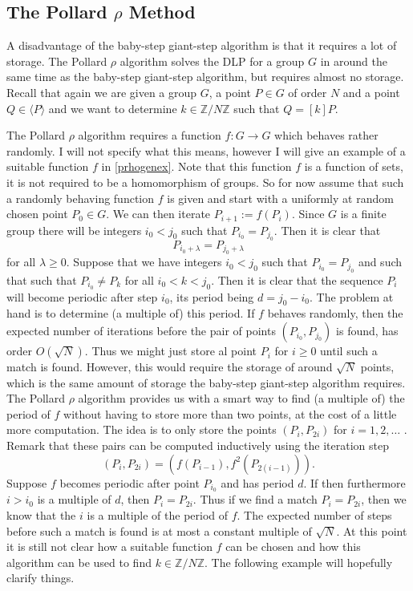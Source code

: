 \documentclass{article}
\numberwithin{equation}{section}
\theoremstyle{definition}
\newcommand{\ZZ}{{\mathbb Z}} %
\newcommand{\Zmod}[1]{\ZZ / #1\ZZ} %
\newcommand{\grgen}[1]{\langle #1 \rangle} %
\begin{document}
\subsection{The Pollard $\rho$ Method}\label{prhomethod}
A disadvantage of the baby-step giant-step algorithm is that it requires a lot of storage. The Pollard $\rho$ algorithm solves the DLP for a group $G$ in around the same time as the baby-step giant-step algorithm, but requires almost no storage. Recall that again we are given a group $G$, a point $P\in G$ of order $N$ and a point $Q\in \grgen{P}$ and we want to determine $k \in \Zmod{N}$ such that $Q=[k]P$. \par 
The Pollard $\rho$ algorithm requires a function $f:G\rightarrow G$ which behaves rather randomly. I will not specify what this means, however I will give an example of a suitable function $f$ in \ref{prhogenex}. Note that this function $f$ is a function of sets, it is not required to be a homomorphism of groups. So for now assume that such a randomly behaving function $f$ is given and start with a uniformly at random chosen point $P_0\in G$. We can then iterate $P_{i+1}:=f(P_i)$. Since $G$ is a finite group there will be integers $i_0<j_0$ such that $P_{i_0}=P_{j_0}$. Then it is clear that $$P_{i_0+\lambda} = P_{j_0+\lambda}$$  for all $\lambda \geq 0$. Suppose that we have integers $i_0<j_0$ such that $P_{i_0}=P_{j_0}$ and such that such that $ P_{i_0} \neq P_k$ for all $i_0<k<j_0$. Then it is clear that the sequence $P_i$ will become periodic after step $i_0$, its period being $d=j_0-i_0$. The problem at hand is to determine (a multiple of) this period. If $f$ behaves randomly, then the expected number of iterations before the pair of points $(P_{i_0},P_{j_0})$ is found, has order $O(\sqrt{N})$. Thus we might just store al point $P_i$ for $i \geq 0$ until such a match is found. However, this would require the storage of around $\sqrt{N}$ points, which is the same amount of storage the baby-step giant-step algorithm requires. The Pollard $\rho$ algorithm provides us with a smart way to find (a multiple of) the period of $f$ without having to store more than two points, at the cost of a little more computation. The idea is to only store the points $(P_i,P_{2i})$ for $i=1,2,\ldots$ . Remark that these pairs can be computed inductively using the iteration step $$(P_{i},P_{2i})=(f(P_{i-1}),f^2(P_{2(i-1)})).$$ Suppose $f$ becomes periodic after point $P_{i_0}$ and has period $d$. If then furthermore $i>i_0$ is a multiple of $d$, then $P_i=P_{2i}$. Thus if we find a match $P_i=P_{2i}$, then we know that the $i$ is a multiple of the period of $f$. The expected number of steps before such a match is found is at most a constant multiple of $\sqrt{N}$. At this point it is still not clear how a suitable function $f$ can be chosen and how this algorithm can be used to find $k \in \Zmod{N}$. The following example will hopefully clarify things.
\end{document}
